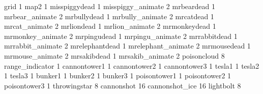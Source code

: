 grid 1
map2 1
misspiggydead 1
misspiggy_animate 2
mrbeardead 1
mrbear_animate 2
mrbullydead 1
mrbully_animate 2
mrcatdead 1
mrcat_animate 2
mrliondead 1
mrlion_animate 2
mrmonkeydead 1
mrmonkey_animate 2
mrpingudead 1
mrpingu_animate 2
mrrabbitdead 1
mrrabbit_animate 2
mrelephantdead 1
mrelephant_animate 2
mrmousedead 1
mrmouse_animate 2
mrsakibdead 1
mrsakib_animate 2
poisoncloud 8
range_indicator 1
cannontower1 1
cannontower2 1
cannontower3 1
tesla1 1
tesla2 1
tesla3 1
bunker1 1
bunker2 1
bunker3 1
poisontower1 1
poisontower2 1
poisontower3 1
throwingstar 8
cannonshot 16
cannonshot_ice 16
lightbolt 8

